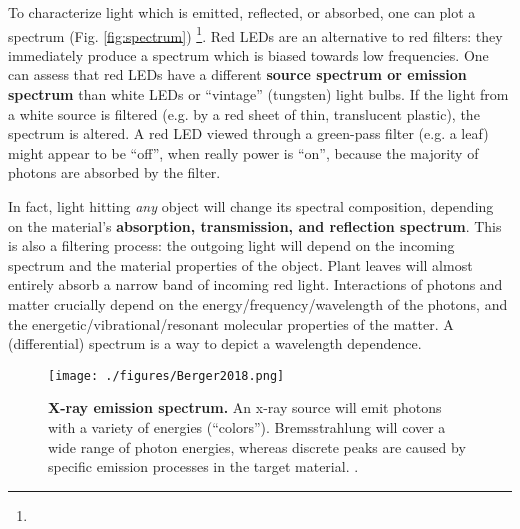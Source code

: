 To characterize light which is emitted, reflected, or absorbed, one can plot a spectrum (Fig. \ref{fig:spectrum}) \footnote{}.
Red LEDs are an alternative to red filters: they immediately produce a spectrum which is biased towards low frequencies.
One can assess that red LEDs have a different \textbf{source spectrum or emission spectrum} than white LEDs or ``vintage'' (tungsten) light bulbs.
If the light from a white source is filtered (e.g. by a red sheet of thin, translucent plastic), the spectrum is altered.
A red LED viewed through a green-pass filter (e.g. a leaf) might appear to be ``off'', when really power is ``on'', because the majority of photons are absorbed by the filter.

In fact, light hitting \emph{any} object will change its spectral composition, depending on the material's \textbf{absorption, transmission, and reflection spectrum}.
This is also a filtering process: the outgoing light will depend on the incoming spectrum and the material properties of the object.
Plant leaves will almost entirely absorb a narrow band of incoming red light.
Interactions of photons and matter crucially depend on the energy/frequency/wavelength of the photons, and the energetic/vibrational/resonant molecular properties of the matter.
A (differential) spectrum is a way to depict a wavelength dependence.


\begin{figure}[p]
\centering
\texttt{[image: ./figures/Berger2018.png]}
\caption{\label{fig:xray_emission}\textbf{X-ray emission spectrum.} An x-ray source will emit photons with a variety of energies (``colors''). Bremsstrahlung will cover a wide range of photon energies, whereas discrete peaks are caused by specific emission processes in the target material. \citep[taken from ][creative commons license]{Berger2018fig8}.}
\end{figure}

